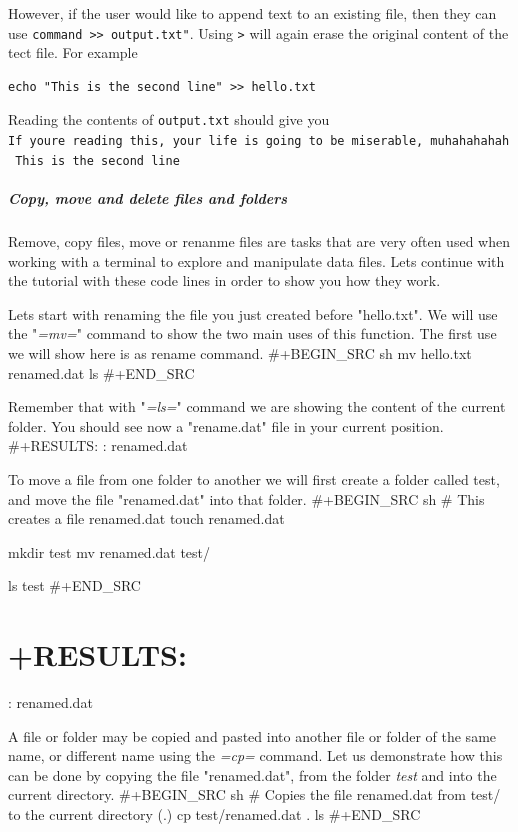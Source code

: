 \documentclass[11pt]{article}
\begin{document}
However, if the user would like to append text to an existing file, then
they can use
\texttt{command\ \textgreater{}\textgreater{}\ output.txt"}. Using
\texttt{\textgreater{}} will again erase the original content of the
tect file. For example

\begin{verbatim}
echo "This is the second line" >> hello.txt
\end{verbatim}

Reading the contents of \texttt{output.txt} should give you
\texttt{If\ you\textquotesingle{}re\ reading\ this,\ your\ life\ is\ going\ to\ be\ miserable,\ muhahahahah\ This\ is\ the\ second\ line}

    \subparagraph{Copy, move and delete files and
folders}\label{copy-move-and-delete-files-and-folders}

Remove, copy files, move or renanme files are tasks that are very often
used when working with a terminal to explore and manipulate data files.
Lets continue with the tutorial with these code lines in order to show
you how they work.

Lets start with renaming the file you just created before "hello.txt".
We will use the "\emph{=mv=}" command to show the two main uses of this
function. The first use we will show here is as rename command.
\#+BEGIN\_SRC sh mv hello.txt renamed.dat ls \#+END\_SRC

Remember that with "\emph{=ls=}" command we are showing the content of
the current folder. You should see now a "rename.dat" file in your
current position. \#+RESULTS: : renamed.dat

To move a file from one folder to another we will first create a folder
called test, and move the file "renamed.dat" into that folder.
\#+BEGIN\_SRC sh \# This creates a file renamed.dat touch renamed.dat

mkdir test mv renamed.dat test/

ls test \#+END\_SRC

\section{+RESULTS:}\label{results}

: renamed.dat

A file or folder may be copied and pasted into another file or folder of
the same name, or different name using the \emph{=cp=} command. Let us
demonstrate how this can be done by copying the file "renamed.dat", from
the folder \emph{test} and into the current directory. \#+BEGIN\_SRC sh
\# Copies the file renamed.dat from test/ to the current directory (.)
cp test/renamed.dat . ls \#+END\_SRC
\end{document}
